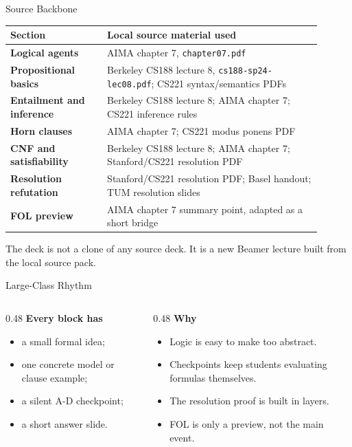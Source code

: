 \documentclass[aspectratio=169,11pt]{beamer}
\newcommand{\minihead}[1]{\textbf{\color{unswblue}#1}}
\begin{document}
\begin{frame}{Source Backbone}
  \small
  \begin{tabular}{>{\bfseries}p{0.28\linewidth}p{0.62\linewidth}}
    \toprule
    Section & Local source material used \\
    \midrule
    Logical agents & AIMA chapter 7, \texttt{chapter07.pdf} \\
    Propositional basics & Berkeley CS188 lecture 8, \texttt{cs188-sp24-lec08.pdf}; CS221 syntax/semantics PDFs \\
    Entailment and inference & Berkeley CS188 lecture 8; AIMA chapter 7; CS221 inference rules \\
    Horn clauses & AIMA chapter 7; CS221 modus ponens PDF \\
    CNF and satisfiability & Berkeley CS188 lecture 8; AIMA chapter 7; Stanford/CS221 resolution PDF \\
    Resolution refutation & Stanford/CS221 resolution PDF; Basel handout; TUM resolution slides \\
    FOL preview & AIMA chapter 7 summary point, adapted as a short bridge \\
    \bottomrule
  \end{tabular}

  \vspace{0.8em}
  The deck is not a clone of any source deck. It is a new Beamer lecture built from the local source pack.
\end{frame}

\begin{frame}{Large-Class Rhythm}
  \begin{columns}[T,onlytextwidth]
    \begin{column}{0.48\textwidth}
      \minihead{Every block has}
      \begin{itemize}
        \item a small formal idea;
        \item one concrete model or clause example;
        \item a silent A-D checkpoint;
        \item a short answer slide.
      \end{itemize}
    \end{column}
    \begin{column}{0.48\textwidth}
      \minihead{Why}
      \begin{itemize}
        \item Logic is easy to make too abstract.
        \item Checkpoints keep students evaluating formulas themselves.
        \item The resolution proof is built in layers.
        \item FOL is only a preview, not the main event.
      \end{itemize}
    \end{column}
  \end{columns}
\end{frame}
\end{document}
